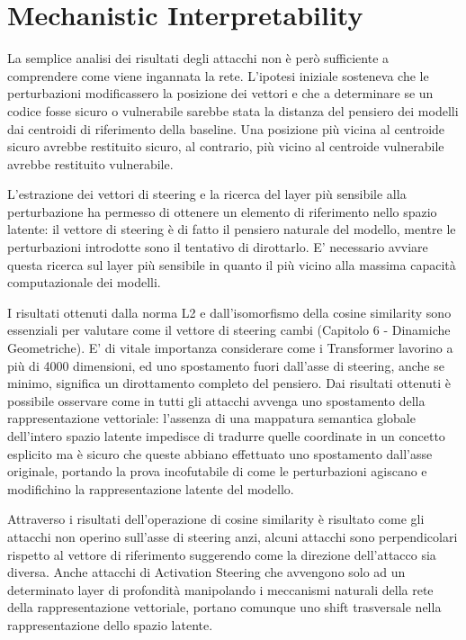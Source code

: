 \section{Mechanistic Interpretability}
La semplice analisi dei risultati degli attacchi non è però sufficiente a comprendere come viene ingannata la rete.
L'ipotesi iniziale sosteneva che le perturbazioni modificassero la posizione dei vettori e che a determinare se un codice fosse sicuro o vulnerabile sarebbe stata la distanza del pensiero dei modelli dai centroidi di riferimento della baseline.
Una posizione più vicina al centroide sicuro avrebbe restituito sicuro, al contrario, più vicino al centroide vulnerabile avrebbe restituito vulnerabile.

L'estrazione dei vettori di steering e la ricerca del layer più sensibile alla perturbazione ha permesso di ottenere un elemento di riferimento nello spazio latente: il vettore di steering è di fatto il pensiero naturale del modello, mentre le perturbazioni introdotte sono il tentativo di dirottarlo.
E' necessario avviare questa ricerca sul layer più sensibile in quanto il più vicino alla massima capacità computazionale dei modelli.

I risultati ottenuti dalla norma L2 e dall'isomorfismo della cosine similarity sono essenziali per valutare come il vettore di steering cambi (Capitolo 6 - Dinamiche Geometriche).
E' di vitale importanza considerare come i Transformer lavorino a più di 4000 dimensioni, ed uno spostamento fuori dall'asse di steering, anche se minimo, significa un dirottamento completo del pensiero.
Dai risultati ottenuti è possibile osservare come in tutti gli attacchi avvenga uno spostamento della rappresentazione vettoriale: l'assenza di una mappatura semantica globale dell'intero spazio latente impedisce di tradurre quelle coordinate in un concetto esplicito ma è sicuro che queste abbiano effettuato uno spostamento dall'asse originale, portando la prova incofutabile di come le perturbazioni agiscano e modifichino la rappresentazione latente del modello.

Attraverso i risultati dell'operazione di cosine similarity è risultato come gli attacchi non operino sull'asse di steering anzi, alcuni attacchi sono perpendicolari rispetto al vettore di riferimento suggerendo come la direzione dell'attacco sia diversa.
Anche attacchi di Activation Steering che avvengono solo ad un determinato layer di profondità manipolando i meccanismi naturali della rete della rappresentazione vettoriale, portano comunque uno shift trasversale nella rappresentazione dello spazio latente.

